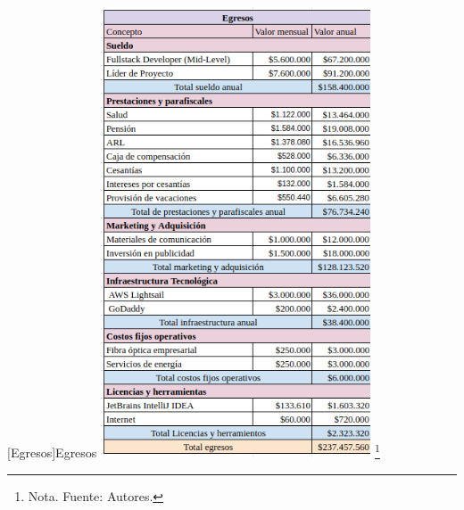 \vspace{2mm}
\begin{minipage}{0.9\textwidth}
\centering
{}[{Egresos}]{Egresos}
\label{egresos}
\includegraphics[width=0.6\textwidth]{Content/Images/AF/egresos.png}
\footnote{Nota. \textup{Fuente: Autores.}}
\end{minipage}
